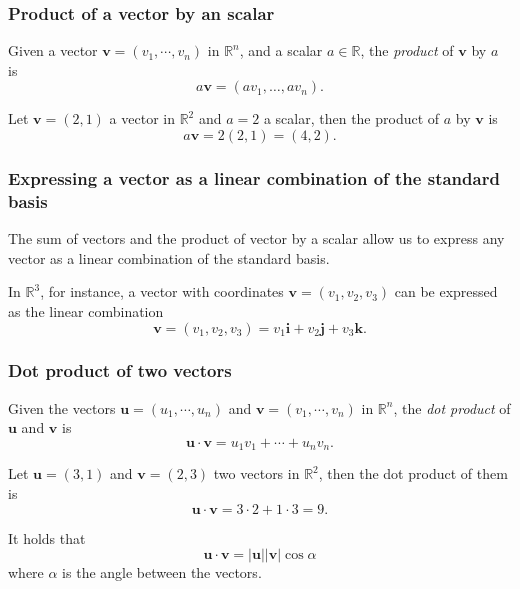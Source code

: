 \begin{frame}
\frametitle{Product of a vector by an scalar}
\begin{definition}
Given a vector $\mathbf{v}=(v_1,\cdots,v_n)$ in $\mathbb{R}^n$, and a scalar $a\in \mathbb{R}$, the \emph{product} of $\mathbf{v}$ by $a$ is 
\[
a\mathbf{v} = (av_1,\ldots, av_n).
\]
\end{definition}
Let $\mathbf{v}=(2,1)$ a vector in $\mathbb{R}^2$ and $a=2$ a scalar, then the product of $a$ by $\mathbf{v}$ is
\[
a\mathbf{v} = 2(2,1) = (4,2).
\]

\begin{center}

\end{center}
\end{frame}


\begin{frame}
\frametitle{Expressing a vector as a linear combination of the standard basis}
The sum of vectors and the product of vector by a scalar allow us to express any vector as a linear combination of the standard basis. 

In $\mathbb{R}^3$, for instance, a vector with coordinates $\mathbf{v}=(v_1,v_2,v_3)$ can be expressed as the linear combination
\[
\mathbf{v}=(v_1,v_2,v_3) = v_1\mathbf{i}+v_2\mathbf{j}+v_3\mathbf{k}.
\]

\begin{center}

\end{center}
\end{frame}


\begin{frame}
\frametitle{Dot product of two vectors}
\begin{definition}
Given the vectors $\mathbf{u}=(u_1,\cdots,u_n)$ and $\mathbf{v}=(v_1,\cdots,v_n)$ in $\mathbb{R}^n$, the 
\emph{dot product} of $\mathbf{u}$ and $\mathbf{v}$ is
\[
\mathbf{u}\cdot \mathbf{v} = u_1v_1 + \cdots + u_nv_n.
\]
\end{definition}

Let $\mathbf{u}=(3,1)$ and $\mathbf{v}=(2,3)$ two vectors in $\mathbb{R}^2$, then the dot product of them is
\[
\mathbf{u}\cdot\mathbf{v} = 3\cdot 2 +1\cdot 3 = 9.
\]

It holds that 
\[
\mathbf{u}\cdot\mathbf{v} =  |\mathbf{u}||\mathbf{v}|\cos\alpha
\]
where $\alpha$ is the angle between the vectors.
\end{frame}


